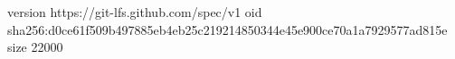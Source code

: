 version https://git-lfs.github.com/spec/v1
oid sha256:d0ce61f509b497885eb4eb25c219214850344e45e900ce70a1a7929577ad815e
size 22000
